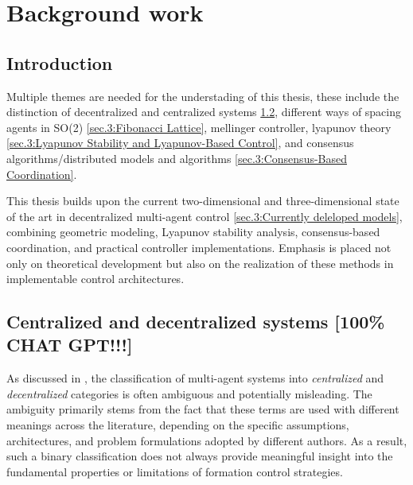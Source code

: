 
%

\chapter{Background work}
\label{cha.3:Background work}

\glsresetall

\section{Introduction} \label{sec.3:Introduction}

Multiple themes are needed for the understading of this thesis, these include the distinction of decentralized and centralized systems \ref{sec.3:Centralized and decentralized systems}, different ways of spacing agents in SO(2) \ref{sec.3:Fibonacci Lattice}, mellinger controller, lyapunov theory \ref{sec.3:Lyapunov Stability and Lyapunov-Based Control}, and consensus algorithms/distributed models and algorithms \ref{sec.3:Consensus-Based Coordination}. 

This thesis builds upon the current two-dimensional and three-dimensional state of the art in decentralized multi-agent control \ref{sec.3:Currently deleloped models}, combining geometric modeling, Lyapunov stability analysis, consensus-based coordination, and practical controller implementations. Emphasis is placed not only on theoretical development but also on the realization of these methods in implementable control architectures.

\section{Centralized and decentralized systems \textbf{[100\% CHAT GPT!!!]}} \label{sec.3:Centralized and decentralized systems}

As discussed in \cite{surver_centralized_decentralized}, the classification of multi-agent systems into \emph{centralized} and \emph{decentralized} categories is often ambiguous and potentially misleading. The ambiguity primarily stems from the fact that these terms are used with different meanings across the literature, depending on the specific assumptions, architectures, and problem formulations adopted by different authors. As a result, such a binary classification does not always provide meaningful insight into the fundamental properties or limitations of formation control strategies.

